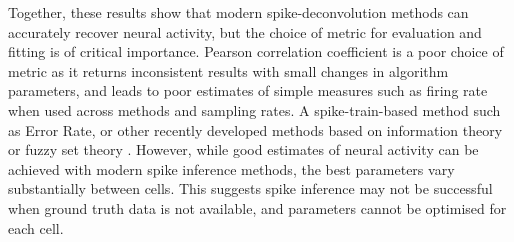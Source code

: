 \documentclass[a4paper,10pt,twocolumn]{article}
\begin{document}
Together, these results show that modern spike-deconvolution methods can accurately recover neural activity, but the choice of metric for evaluation and fitting is of critical importance. Pearson correlation coefficient is a poor choice of metric as it returns inconsistent results with small changes in algorithm parameters, and leads to poor estimates of simple measures such as firing rate when used across methods and sampling rates. A spike-train-based method such as Error Rate\citep{Deneux2016-gu, Victor1996-cg}, or other recently developed methods based on information theory \citep{Theis2016-ee} or fuzzy set theory \citep{Reynolds2017-dr}. However, while good estimates of neural activity can be achieved with modern spike inference methods, the best parameters vary substantially between cells. This suggests spike inference may not be successful when ground truth data is not available, and parameters cannot be optimised for each cell.




\end{document}
